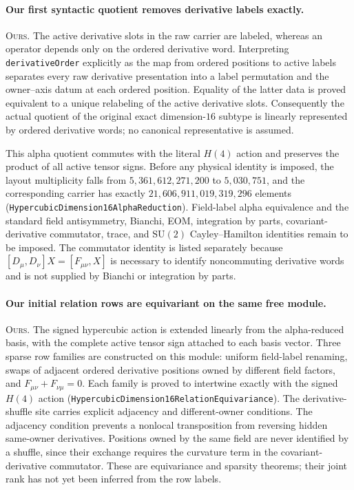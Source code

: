 \documentclass[11pt]{article}
\theoremstyle{definition}
\begin{document}
\paragraph{Our first syntactic quotient removes derivative labels exactly.}
\textsc{Ours.} The active derivative slots in the raw carrier are labeled,
whereas an operator depends only on the ordered derivative word.  Interpreting
\texttt{derivativeOrder} explicitly as the map from ordered positions to
active labels separates every raw derivative presentation into a label
permutation and the owner--axis datum at each ordered position.  Equality of
the latter data is proved equivalent to a unique relabeling of the active
derivative slots.  Consequently the actual quotient of the original exact
dimension-$16$ subtype is linearly represented by ordered derivative words;
no canonical representative is assumed.

This alpha quotient commutes with the literal $H(4)$ action and preserves the
product of all active tensor signs.  Before any physical identity is imposed,
the layout multiplicity falls from $5{,}361{,}612{,}271{,}200$ to
$5{,}030{,}751$, and the corresponding carrier has exactly
$21{,}606{,}911{,}019{,}319{,}296$ elements
(\texttt{HypercubicDimension16AlphaReduction}).  Field-label alpha
equivalence and the standard field antisymmetry, Bianchi, EOM, integration by
parts, covariant-derivative commutator, trace, and $\mathrm{SU}(2)$
Cayley--Hamilton identities remain to be imposed.  The commutator identity is
listed separately because $[D_\mu,D_\nu]X=[F_{\mu\nu},X]$ is necessary to
identify noncommuting derivative words and is not supplied by Bianchi or
integration by parts.

\paragraph{Our initial relation rows are equivariant on the same free
module.}
\textsc{Ours.} The signed hypercubic action is extended linearly from the
alpha-reduced basis, with the complete active tensor sign attached to each
basis vector.  Three sparse row families are constructed on this module:
uniform field-label renaming, swaps of adjacent ordered derivative positions
owned by different field factors, and
\(F_{\mu\nu}+F_{\nu\mu}=0\).  Each family is proved to intertwine exactly with
the signed $H(4)$ action
(\texttt{HypercubicDimension16RelationEquivariance}).  The derivative-shuffle
site carries explicit adjacency and different-owner conditions.  The
adjacency condition prevents a nonlocal transposition from reversing hidden
same-owner derivatives.  Positions owned by the same field are never
identified by a shuffle, since their exchange requires the curvature term in
the covariant-derivative commutator.  These are
equivariance and sparsity theorems; their joint rank has not yet been inferred
from the row labels.
\end{document}
